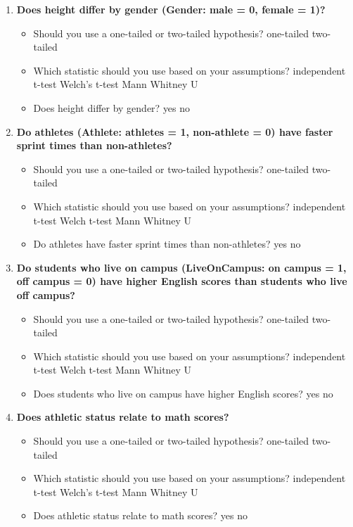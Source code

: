 \documentclass[
]{book}
\begin{document}
\begin{enumerate}
\def\labelenumi{\arabic{enumi}.}
\item
  \textbf{Does height differ by gender (Gender: male = 0, female = 1)?}

  \begin{itemize}
  \item
    Should you use a one-tailed or two-tailed hypothesis? one-tailed two-tailed
  \item
    Which statistic should you use based on your assumptions? independent t-test Welch's t-test Mann Whitney U
  \item
    Does height differ by gender? yes no
  \end{itemize}
\item
  \textbf{Do athletes (Athlete: athletes = 1, non-athlete = 0) have faster sprint times than non-athletes?}

  \begin{itemize}
  \item
    Should you use a one-tailed or two-tailed hypothesis? one-tailed two-tailed
  \item
    Which statistic should you use based on your assumptions? independent t-test Welch t-test Mann Whitney U
  \item
    Do athletes have faster sprint times than non-athletes? yes no
  \end{itemize}
\item
  \textbf{Do students who live on campus (LiveOnCampus: on campus = 1, off campus = 0) have higher English scores than students who live off campus?}

  \begin{itemize}
  \item
    Should you use a one-tailed or two-tailed hypothesis? one-tailed two-tailed
  \item
    Which statistic should you use based on your assumptions? independent t-test Welch t-test Mann Whitney U
  \item
    Does students who live on campus have higher English scores? yes no
  \end{itemize}
\item
  \textbf{Does athletic status relate to math scores?}

  \begin{itemize}
  \item
    Should you use a one-tailed or two-tailed hypothesis? one-tailed two-tailed
  \item
    Which statistic should you use based on your assumptions? independent t-test Welch's t-test Mann Whitney U
  \item
    Does athletic status relate to math scores? yes no
  \end{itemize}
\end{enumerate}
\end{document}
